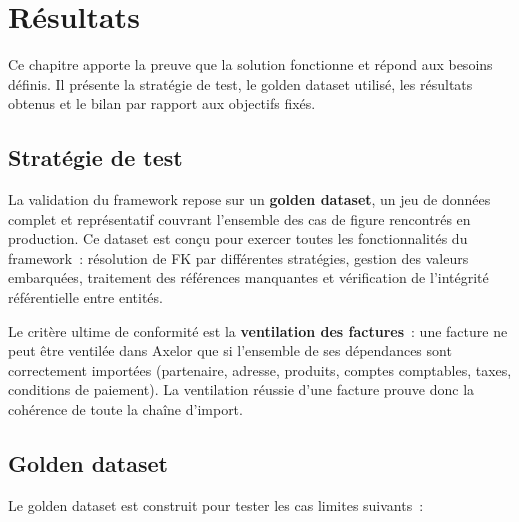 \chapter{Résultats}
\label{chap:resultats}

Ce chapitre apporte la preuve que la solution fonctionne et répond aux besoins définis. Il présente la stratégie de test, le golden dataset utilisé, les résultats obtenus et le bilan par rapport aux objectifs fixés.

\section{Stratégie de test}

La validation du framework repose sur un \textbf{golden dataset}, un jeu de données complet et représentatif couvrant l'ensemble des cas de figure rencontrés en production. Ce dataset est conçu pour exercer toutes les fonctionnalités du framework~: résolution de FK par différentes stratégies, gestion des valeurs embarquées, traitement des références manquantes et vérification de l'intégrité référentielle entre entités.

Le critère ultime de conformité est la \textbf{ventilation des factures}~: une facture ne peut être ventilée dans Axelor que si l'ensemble de ses dépendances sont correctement importées (partenaire, adresse, produits, comptes comptables, taxes, conditions de paiement). La ventilation réussie d'une facture prouve donc la cohérence de toute la chaîne d'import.

\section{Golden dataset}

Le golden dataset est construit pour tester les cas limites suivants~:

